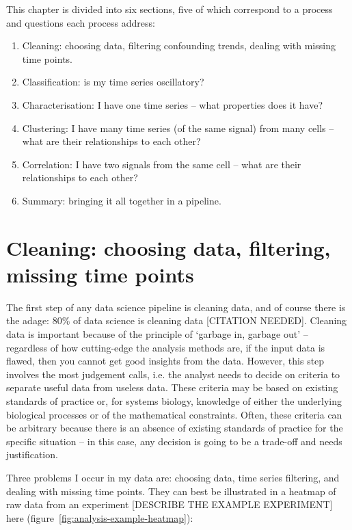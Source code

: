 This chapter is divided into six sections, five of which correspond to a process and questions each process address:
\begin{enumerate}
  \item Cleaning: choosing data, filtering confounding trends, dealing with missing time points.
  \item Classification: is my time series oscillatory?
  \item Characterisation: I have one time series -- what properties does it have?
  \item Clustering: I have many time series (of the same signal) from many cells -- what are their relationships to each other?
  \item Correlation: I have two signals from the same cell -- what are their relationships to each other?
  \item Summary: bringing it all together in a pipeline.
\end{enumerate}

\section{Cleaning: choosing data, filtering, missing time points}
\label{sec:analysis-cleaning}

The first step of any data science pipeline is cleaning data, and of course there is the adage: 80\% of data science is cleaning data [CITATION NEEDED].
Cleaning data is important because of the principle of `garbage in, garbage out' -- regardless of how cutting-edge the analysis methods are, if the input data is flawed, then you cannot get good insights from the data.
However, this step involves the most judgement calls, i.e. the analyst needs to decide on criteria to separate useful data from useless data.
These criteria may be based on existing standards of practice or, for systems biology, knowledge of either the underlying biological processes or of the mathematical constraints.
Often, these criteria can be arbitrary because there is an absence of existing standards of practice for the specific situation -- in this case, any decision is going to be a trade-off and needs justification.

Three problems I occur in my data are: choosing data, time series filtering, and dealing with missing time points.
They can best be illustrated in a heatmap of raw data from an experiment [DESCRIBE THE EXAMPLE EXPERIMENT] here (figure~\ref{fig:analysis-example-heatmap}):

